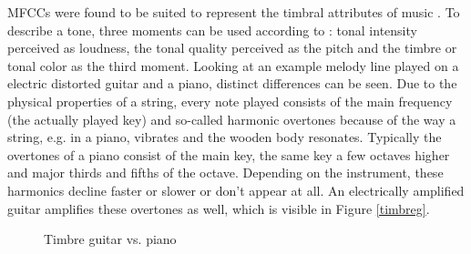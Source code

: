 \FloatBarrier
MFCCs were found to be suited to represent the timbral attributes of music \cite[p. 55 ff]{knees1}. To describe a tone, three moments can be used according to \cite[pp. 15]{musicdata}: tonal intensity perceived as loudness, the tonal quality perceived as the pitch and the timbre or tonal color as the third moment. Looking at an example melody line played on a electric distorted guitar and a piano, distinct differences can be seen. Due to the physical properties of a string, every note played consists of the main frequency (the actually played key) and so-called harmonic overtones because of the way a string, e.g. in a piano, vibrates and the wooden body resonates. Typically the overtones of a piano consist of the main key, the same key a few octaves higher and major thirds and fifths of the octave. Depending on the instrument, these harmonics decline faster or slower or don't appear at all. An electrically amplified guitar amplifies these overtones as well, which is visible in Figure \ref{timbreg}.
\begin{figure}[htbp]
	\centering
	\caption{Timbre guitar vs. piano}	
	\label{fig:timbre}
\end{figure}
